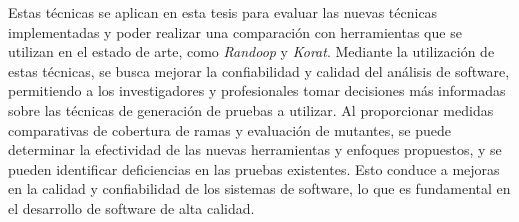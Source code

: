 Estas técnicas se aplican en esta tesis para evaluar las nuevas técnicas implementadas y poder realizar una comparación con herramientas que se utilizan en el estado de arte, como \emph{Randoop} y \emph{Korat}. Mediante la utilización de estas técnicas, se busca mejorar la confiabilidad y calidad del análisis de software, permitiendo a los investigadores y profesionales tomar decisiones más informadas sobre las técnicas de generación de pruebas a utilizar. Al proporcionar medidas comparativas de cobertura de ramas y evaluación de mutantes, se puede determinar la efectividad de las nuevas herramientas y enfoques propuestos, y se pueden identificar deficiencias en las pruebas existentes. Esto conduce a mejoras en la calidad y confiabilidad de los sistemas de software, lo que es fundamental en el desarrollo de software de alta calidad.

